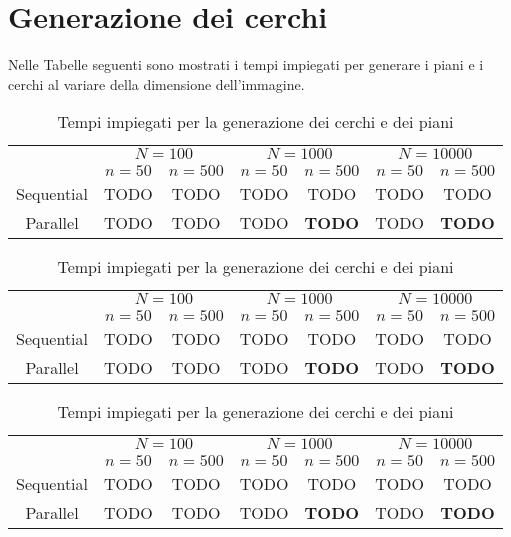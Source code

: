 
\section{Generazione dei cerchi}
Nelle Tabelle seguenti sono mostrati i tempi impiegati per generare i piani e i cerchi al variare della dimensione dell'immagine.

\begin{table}[H]
    \centering
    \begin{tabular}{c|c|c|c|c|c|c|}
        & \multicolumn{2}{|c|}{$N = 100$} & \multicolumn{2}{|c|}{$N = 1000$} & \multicolumn{2}{|c|}{$N = 10000$} \\
        & $n=50$ & $n=500$ & $n=50$ & $n=500$ & $n=50$ & $n=500$ \\
        \hline
        Sequential & TODO & TODO & TODO & TODO & TODO & TODO \\
        Parallel & TODO & TODO & TODO & \textbf{TODO} & TODO & \textbf{TODO} \\
    \end{tabular}
    \caption{\label{tab:gen256}Tempi impiegati per la generazione dei cerchi e dei piani}
\end{table}

\begin{table}[H]
    \centering
    \begin{tabular}{c|c|c|c|c|c|c|}
        & \multicolumn{2}{|c|}{$N = 100$} & \multicolumn{2}{|c|}{$N = 1000$} & \multicolumn{2}{|c|}{$N = 10000$} \\
        & $n=50$ & $n=500$ & $n=50$ & $n=500$ & $n=50$ & $n=500$ \\
        \hline
        Sequential & TODO & TODO & TODO & TODO & TODO & TODO \\
        Parallel & TODO & TODO & TODO & \textbf{TODO} & TODO & \textbf{TODO} \\
    \end{tabular}
    \caption{\label{tab:gen512b}Tempi impiegati per la generazione dei cerchi e dei piani}
\end{table}

\begin{table}[H]
    \centering
    \begin{tabular}{c|c|c|c|c|c|c|}
        & \multicolumn{2}{|c|}{$N = 100$} & \multicolumn{2}{|c|}{$N = 1000$} & \multicolumn{2}{|c|}{$N = 10000$} \\
        & $n=50$ & $n=500$ & $n=50$ & $n=500$ & $n=50$ & $n=500$ \\
        \hline
        Sequential & TODO & TODO & TODO & TODO & TODO & TODO \\
        Parallel & TODO & TODO & TODO & \textbf{TODO} & TODO & \textbf{TODO} \\
    \end{tabular}
    \caption{\label{tab:gen1024}Tempi impiegati per la generazione dei cerchi e dei piani}
\end{table}